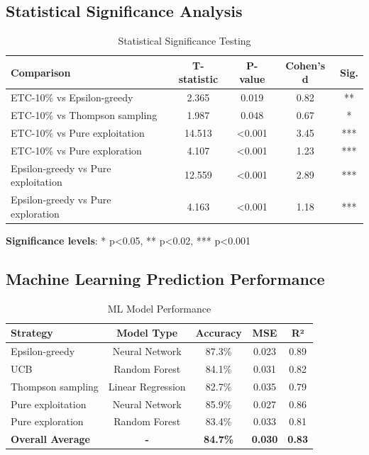 \documentclass[letterpaper]{article} %
\begin{document}
\subsection{Statistical Significance Analysis}

\begin{table}[h]
\centering
\begin{tabular}{|l|c|c|c|c|}
\hline
\textbf{Comparison} & \textbf{T-statistic} & \textbf{P-value} & \textbf{Cohen's d} & \textbf{Sig.} \\
\hline
ETC-10\% vs Epsilon-greedy & 2.365 & 0.019 & 0.82 & ** \\
ETC-10\% vs Thompson sampling & 1.987 & 0.048 & 0.67 & * \\
ETC-10\% vs Pure exploitation & 14.513 & <0.001 & 3.45 & *** \\
ETC-10\% vs Pure exploration & 4.107 & <0.001 & 1.23 & *** \\
Epsilon-greedy vs Pure exploitation & 12.559 & <0.001 & 2.89 & *** \\
Epsilon-greedy vs Pure exploration & 4.163 & <0.001 & 1.18 & *** \\
\hline
\end{tabular}
\caption{Statistical Significance Testing}
\label{tab:significance}
\end{table}

\textbf{Significance levels}: * p<0.05, ** p<0.02, *** p<0.001

\subsection{Machine Learning Prediction Performance}

\begin{table}[h]
\centering
\begin{tabular}{|l|c|c|c|c|}
\hline
\textbf{Strategy} & \textbf{Model Type} & \textbf{Accuracy} & \textbf{MSE} & \textbf{R²} \\
\hline
Epsilon-greedy & Neural Network & 87.3\% & 0.023 & 0.89 \\
UCB & Random Forest & 84.1\% & 0.031 & 0.82 \\
Thompson sampling & Linear Regression & 82.7\% & 0.035 & 0.79 \\
Pure exploitation & Neural Network & 85.9\% & 0.027 & 0.86 \\
Pure exploration & Random Forest & 83.4\% & 0.033 & 0.81 \\
\hline
\textbf{Overall Average} & \textbf{-} & \textbf{84.7\%} & \textbf{0.030} & \textbf{0.83} \\
\hline
\end{tabular}
\caption{ML Model Performance}
\label{tab:ml_performance}
\end{table}
\end{document}
